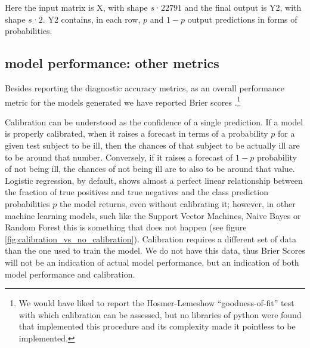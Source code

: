 \documentclass[a4paper,12pt]{elsarticle}  %
\begin{document}
Here the input matrix is X, with shape $s$·$22791$ and the final output is Y2, with shape $s$·$2$. Y2 contains, in each row, $p$ and $1-p$ output predictions in forms of probabilities.






\subsection{model performance: other metrics}

Besides reporting the diagnostic accuracy metrics, as an overall performance metric for the models generated we have reported Brier scores \cite{Waljee2014, Gerds2008457}.\footnote{We would have liked to report the Hosmer-Lemeshow ``goodness-of-fit'' test \cite{Luo2016, Waljee2014, Steyerberg2010128} with which calibration can be assessed, but no libraries of python were found that implemented this procedure and its complexity made it pointless to be implemented.} 

Calibration can be understood as the confidence of a single prediction. If a model is properly calibrated, when it raises a forecast in terms of a probability $p$ for a given test subject to be ill, then the chances of that subject to be actually ill are to be around that number. Conversely, if it raises a forecast of $\textit{1}-p$ probability of not being ill, the chances of not being ill are to also to be around that value. Logistic regression, by default, shows almost a perfect linear relationship between the fraction of true positives and true negatives and the class prediction probabilities $p$ the model returns, even without calibrating it; however, in other machine learning models, such like the Support Vector Machines, Naive Bayes or Random Forest this is something that does not happen\cite{sklearn-calibration} (see figure \ref{fig:calibration_vs_no_calibration}). Calibration requires a different set of data than the one used to train the model\cite{sklearn-calibration}. We do not have this data, thus Brier Scores will not be an indication of actual model performance, but an indication of both model performance and calibration.
\end{document}
